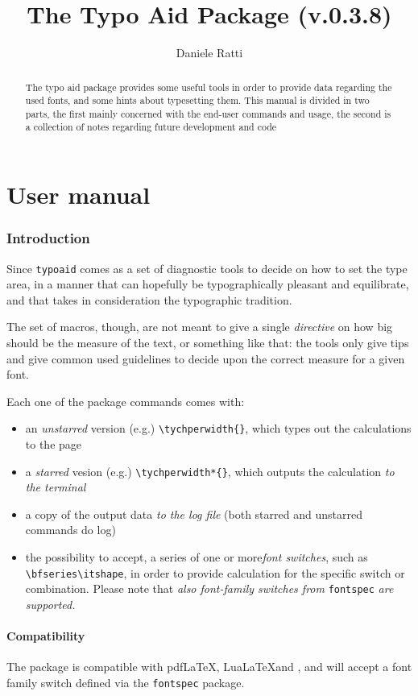 \documentclass{article}
\author{Daniele Ratti}
\title{The Typo Aid Package (v.0.3.8)}
\begin{document}
\maketitle

\begin{abstract}
The typo aid package provides some useful tools in order to provide data regarding the used fonts, and some hints about typesetting them. This manual is divided in two parts, the first mainly concerned with the end-user commands and usage, the second is a collection of notes regarding future development and code
\end{abstract}
\tableofcontents
\part{User manual}
\section{Introduction}
Since \texttt{typoaid} comes as a set of diagnostic tools to decide on how to set the type area,  in a manner that can hopefully be typographically pleasant and equilibrate, and that takes in consideration the typographic tradition.

The set of macros, though, are not meant to give a single \emph{directive} on how big should be the measure of the text, or something like that: the tools only give tips and give common used guidelines to decide upon the correct measure for a given font.

Each one of the package commands comes with:
\begin{itemize}
\item an \emph{unstarred} version (e.g.)  \verb|\tychperwidth{}|, which types out the calculations to the page
\item a \emph{starred} vesion (e.g.) \verb!\tychperwidth*{}!, which outputs the calculation \emph{to the terminal}
\item a copy of the output data \emph{to the log file} (both starred and unstarred commands do log)
\item the possibility to accept, a series of  one or more\emph{font switches}, such as \verb|\bfseries\itshape|, in order to provide calculation for the specific switch or combination. Please note that \emph{also font-family switches from} \texttt{fontspec} \emph{are supported.}
\end{itemize}
\subsection{Compatibility}
The package is compatible with pdf{}\LaTeX, Lua\LaTeX and \XeLaTeX, and will accept a font family switch defined via the \texttt{fontspec} package.
\end{document}
